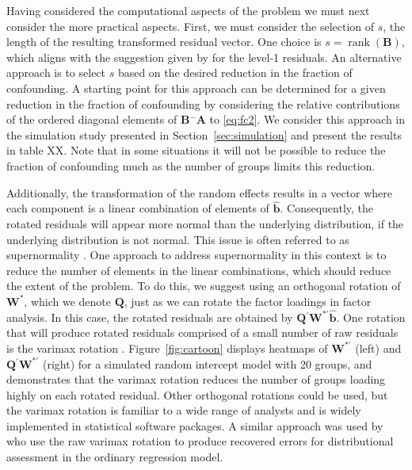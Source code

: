\documentclass[12pt]{article} %
\newcommand{\al}[1]{{\color{red} #1}}
\newcommand{\ginv}{\ensuremath{^{-}}}
\newcommand{\trans}{\ensuremath{^\prime}}
\DeclareMathOperator{\rank}{rank}
\begin{document}

Having considered the computational aspects of the problem we must next consider the more practical aspects. First, we must consider the selection of $s$,  the length of the resulting transformed residual vector. One choice is $s = \rank(\bm{B})$, which aligns with the suggestion given by \cite{HildenMinton:1995wh} for the level-1 residuals. 
An alternative approach is to select $s$ based on the desired reduction in the fraction of confounding. A starting point for this approach can be determined for a given reduction in the fraction of confounding by considering the relative contributions of the ordered diagonal elements of $\bm{B}\ginv\bm{A}$ to \eqref{eq:fc2}. We consider this approach in the simulation study presented in Section~\ref{sec:simulation} and present the results in table XX. Note that in some situations it will not be possible to reduce the fraction of confounding much as the number of groups limits this reduction.


Additionally, the transformation of the random effects results in a vector where each component is a linear combination of elements of $\widehat{\bm{b}}$. Consequently, the rotated residuals will appear more normal than the underlying distribution, if the underlying distribution is not normal. This issue is often referred to as supernormality \citep{Atkinson:1985}. One approach to address supernormality in this context is to reduce the number of elements in the linear combinations, which should reduce the extent of the problem. To do this, we suggest using an orthogonal rotation of $\bm{W}^*$, which we denote $\bm{Q}$, just as we can rotate the factor loadings in factor analysis. In this case, the rotated residuals are obtained by $\bm{Q}\trans \bm{W}^{*\prime} \widehat{\bm{b}}$. One rotation that will produce rotated residuals comprised of a small number of raw residuals is the varimax rotation \citep{Johnson:2007}. Figure~\ref{fig:cartoon} displays heatmaps of $\bm{W}^{*\prime}$ (left) and $\bm{Q}\trans\bm{W}^{*\prime}$ (right) for a simulated random intercept model with 20 groups, and demonstrates that the varimax rotation reduces the number of groups loading highly on each rotated residual.  Other orthogonal rotations could be used, but the varimax rotation is familiar to a wide range of analysts and is widely implemented in statistical software packages. A similar approach was used by \cite{Jensen:1999iu} who use the raw varimax rotation to produce recovered errors for distributional assessment in the ordinary regression model.
\end{document}
